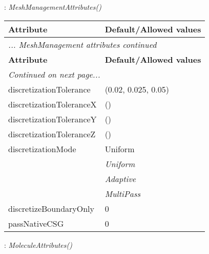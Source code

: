 \documentclass[10pt,a4paper]{report}
\begin{document}
\newpage

{}
: {\it MeshManagementAttributes() }\\[-3mm]

\begin{longtable}{ll}
{\bf Attribute} & {\bf Default/Allowed values} \\
\hline \hline
\endfirsthead
\multicolumn{2}{l}{{\it ... MeshManagement attributes continued}} \\
{\bf Attribute} & {\bf Default/Allowed values} \\
\hline \hline
\endhead
\hline
\multicolumn{2}{l}{{\it Continued on next page...}} \\
\endfoot
\hline
\endlastfoot

discretizationTolerance  &  (0.02, 0.025, 0.05) \\
discretizationToleranceX  &  () \\
discretizationToleranceY  &  () \\
discretizationToleranceZ  &  () \\
discretizationMode  &  Uniform   \\
 & {\it  Uniform} \\
 & {\it  Adaptive} \\
 & {\it  MultiPass} \\
discretizeBoundaryOnly  &  0 \\
passNativeCSG  &  0 \\
\end{longtable}

\newpage

{}
: {\it MoleculeAttributes() }\\[-3mm]
\end{document}

